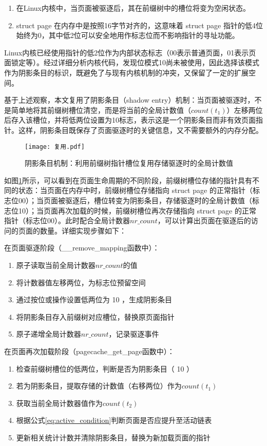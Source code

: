 \begin{enumerate}
  \item 在Linux内核中，当页面被驱逐后，其在前缀树中的槽位将变为空闲状态。
  \item  struct page 在内存中是按照16字节对齐的，这意味着 struct page 指针的低4位始终为0，其中低2位可以安全地用作标志位而不影响指针的寻址功能。
\end{enumerate}

Linux内核已经使用指针的低2位作为内部状态标志（00表示普通页面，01表示页面锁定等）。经过详细分析内核代码，发现位模式10尚未被使用，因此选择该模式作为阴影条目的标识，既避免了与现有内核机制的冲突，又保留了一定的扩展空间。

基于上述观察，本文复用了阴影条目（shadow entry）机制：当页面被驱逐时，不是简单地将其前缀树槽位清空，而是将当前的全局计数值（\(count(t_1)\)）左移两位后存入该槽位，并将低两位设置为10标志，表示这是一个阴影条目而非有效页面指针。这样，阴影条目既保存了页面驱逐时的关键信息，又不需要额外的内存分配。

\begin{figure}[htbp]
  \centering
  \texttt{[image: 复用.pdf]}
  \caption{阴影条目机制：利用前缀树指针槽位复用存储驱逐时的全局计数值}
  \label{fig:复用}
\end{figure}

如图\ref{fig:复用}所示，可以看到在页面生命周期的不同阶段，前缀树槽位存储的指针具有不同的状态：当页面在内存中时，前缀树槽位存储指向 struct page 的正常指针（标志位00）；当页面被驱逐后，槽位转变为阴影条目，存储驱逐时的全局计数值（标志位10）；当页面再次加载的时候，前缀树槽位再次存储指向 struct page 的正常指针（标志位00）。此时配合全局计数器\(nr\_count\)，可以计算出页面在驱逐后的访问的页面的数量。详细实现步骤如下：

在页面驱逐阶段（\_\_remove\_mapping函数中）：
\begin{enumerate}
  \item 原子读取当前全局计数器\(nr\_count\)的值
  \item 将计数器值左移两位，为标志位预留空间
  \item 通过按位或操作设置低两位为 10 ，生成阴影条目
  \item 将阴影条目存入前缀树对应槽位，替换原页面指针
  \item 原子递增全局计数器\(nr\_count\)，记录驱逐事件
\end{enumerate}

在页面再次加载阶段（pagecache\_get\_page函数中）：
\begin{enumerate}
  \item 检查前缀树槽位的低两位，判断是否为阴影条目（ 10 ）
  \item 若为阴影条目，提取存储的计数值（右移两位）作为\(count(t_1)\)
  \item 获取当前全局计数器值作为\(count(t_2)\)
  \item 根据公式\ref{eq:active_condition}判断页面是否应提升至活动链表
  \item 更新相关统计计数并清除阴影条目，替换为新加载页面的指针
\end{enumerate}

